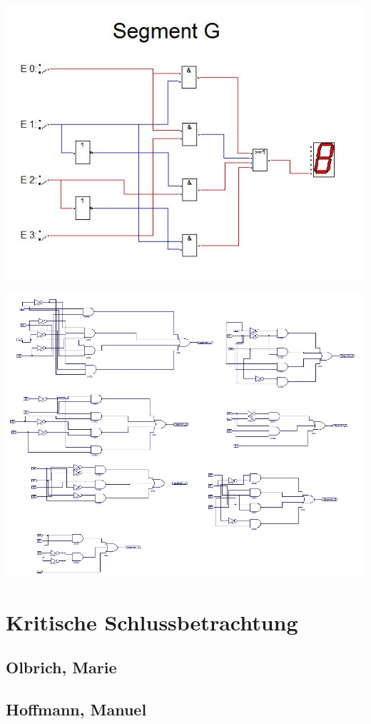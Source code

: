 \documentclass[a4paper, 11pt, fleqn, DIV=10, twoside, BCOR=10mm]{scrreprt}
\begin{document}
\begin{center}
\includegraphics[width=0.8\columnwidth]{DT4Graphics/Segment_G.jpg}


\includegraphics[width=1.2\columnwidth]{DT4Graphics/alle_schaltungen.jpg}
\end{center}
\newpage
\chapter{Kritische Schlussbetrachtung}
\section{Olbrich, Marie}
 
\section{Hoffmann, Manuel}
\end{document}
